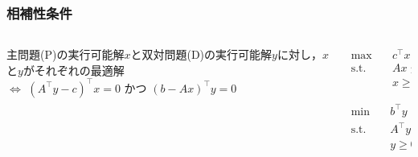 \documentclass[14pt,aspectratio=169,xcolor=dvipsnames,table,onlytextwidth,dvipdfmx]{beamer}
\begin{document}
\begin{frame}
    \frametitle{相補性条件}

    \small
    \begin{columns}[T]
    \begin{column}{.75\textwidth}
    \begin{theorem}[相補性条件]
        主問題(P)の実行可能解$x$と双対問題(D)の実行可能解$y$に対し，$x$と$y$がそれぞれの最適解 \\ 
        $\iff$ 
            $(A^\top y - c)^\top x = 0$
            かつ 
            $(b - Ax)^\top y = 0$  
    \end{theorem}

    \end{column}
    \begin{column}{.2\textwidth}
    \footnotesize
    \begin{primal}
        \setlength{\abovedisplayskip}{0pt}
        \begin{alignat*}{2}
            \text{max} & \quad  c^\top x \\
            \text{s.t.} & \quad A x \leq b  \\
            & \quad x \geq 0 
        \end{alignat*}
    \end{primal}
    \begin{dual}
        \setlength{\abovedisplayskip}{0pt}
        \begin{alignat*}{2}
            \text{min} & \quad  b^\top y \\
            \text{s.t.} & \quad A^\top y \geq c  \\
            & \quad y \geq 0 
        \end{alignat*}
    \end{dual}
    \end{column}
    \end{columns}
\end{frame}
\end{document}
